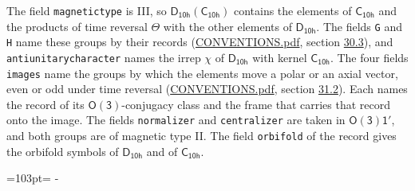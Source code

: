 \documentclass[10pt,a4paper]{article}
\newcommand{\needspace}[1]{\par\penalty-100\begingroup\dimen0=#1\relax\dimen2=\pagegoal
  \advance\dimen2-\pagetotal\ifdim\dimen0>\dimen2\relax\ifdim\dimen2>0pt\vfil\break\fi\fi
  \endgroup}
\numberwithin{equation}{section}
\newcommand{\grp}[1]{\mathsf{#1}}
\begin{document}
The field \texttt{magnetictype} is III, so $\grp{D_{10h}}(\grp{C_{10h}})$ contains the elements of $\grp{C_{10h}}$ and the products of time reversal $\varTheta$ with the other elements of $\grp{D_{10h}}$. The fields \texttt{G} and \texttt{H} name these groups by their records (\href{../../CONVENTIONS.pdf}{CONVENTIONS.pdf}, section \href{../../CONVENTIONS.pdf\#conv.30.3}{30.3}), and \texttt{antiunitarycharacter} names the irrep $\chi$ of $\grp{D_{10h}}$ with kernel $\grp{C_{10h}}$. The four fields \texttt{images} name the groups by which the elements move a polar or an axial vector, even or odd under time reversal (\href{../../CONVENTIONS.pdf}{CONVENTIONS.pdf}, section \href{../../CONVENTIONS.pdf\#conv.31.2}{31.2}). Each names the record of its $\grp{O(3)}$-conjugacy class and the frame that carries that record onto the image. The fields \texttt{normalizer} and \texttt{centralizer} are taken in $\grp{O(3)1'}$, and both groups are of magnetic type II. The field \texttt{orbifold} of the record gives the orbifold symbols of $\grp{D_{10h}}$ and of $\grp{C_{10h}}$.
\needspace{103pt}
\end{document}
